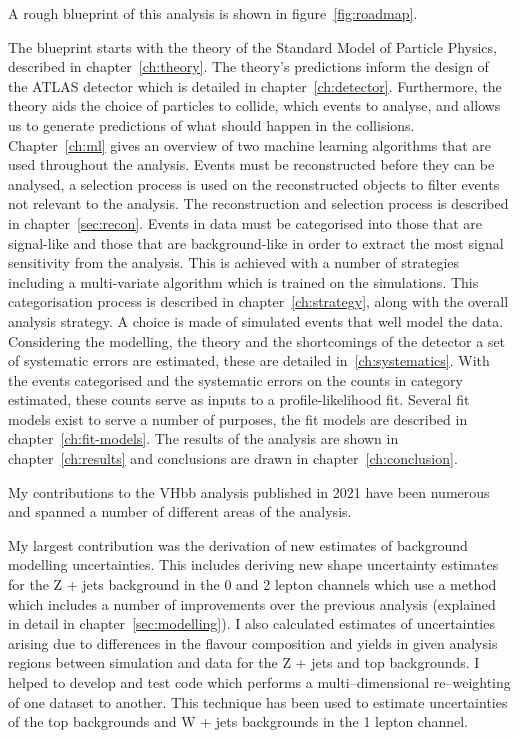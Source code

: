 A rough blueprint of this analysis is shown in figure~\ref{fig:roadmap}.

The blueprint starts with the theory of the Standard Model of Particle Physics,
described in chapter~\ref{ch:theory}. The theory's predictions inform the
design of the ATLAS detector which is detailed in chapter~\ref{ch:detector}.
Furthermore, the theory aids the choice of particles to collide, which events to
analyse, and allows us to generate predictions of what should happen in the
collisions. Chapter~\ref{ch:ml} gives an overview of two machine learning
algorithms that are used throughout the analysis. Events must be reconstructed
before they can be analysed, a selection process is used on the reconstructed
objects to filter events not relevant to the analysis. The reconstruction and
selection process is described in chapter~\ref{sec:recon}. Events in data must
be categorised into those that are signal-like and those that are
background-like in order to extract the most signal sensitivity from the
analysis. This is achieved with a number of strategies including a multi-variate
algorithm which is trained on the simulations. This categorisation process is
described in chapter~\ref{ch:strategy}, along with the overall analysis
strategy. A choice is made of simulated events that well model the data.
Considering the modelling, the theory and the shortcomings of the detector a set
of systematic errors are estimated, these are detailed in~\ref{ch:systematics}.
With the events categorised and the systematic errors on the counts in category
estimated, these counts serve as inputs to a profile-likelihood fit. Several fit
models exist to serve a number of purposes, the fit models are described in
chapter~\ref{ch:fit-models}. The results of the analysis are shown in
chapter~\ref{ch:results} and conclusions are drawn in
chapter~\ref{ch:conclusion}.


My contributions to the VHbb analysis published in 2021 have been numerous and
spanned a number of different areas of the analysis.

My largest contribution was the derivation of new estimates of background
modelling uncertainties. This includes deriving new shape uncertainty estimates
for the Z + jets background in the 0 and 2 lepton channels which use a method
which includes a number of improvements over the previous analysis (explained in
detail in chapter~\ref{sec:modelling}). I also calculated estimates of
uncertainties arising due to differences in the flavour composition and yields
in given analysis regions between simulation and data for the Z + jets and top
backgrounds. I helped to develop and test code which performs a
multi--dimensional re--weighting of one dataset to another. This technique has
been used to estimate uncertainties of the top backgrounds and W + jets
backgrounds in the 1 lepton channel.

